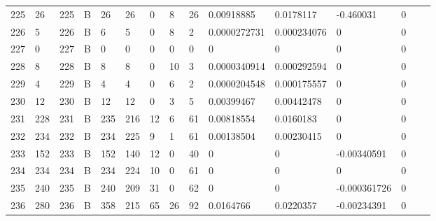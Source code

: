 \begin{longtable}{lllllllllllllll}
	225 & 26                & 225 & B   & 26                & 26                & 0                 & 8    & 26         & 0.00918885     & 0.0178117      & -0.460031     & 0            \\
	226 & 5                 & 226 & B   & 6                 & 5                 & 0                 & 8    & 2          & 0.0000272731   & 0.000234076    & 0             & 0            \\
	227 & 0                 & 227 & B   & 0                 & 0                 & 0                 & 0    & 0          & 0              & 0              & 0             & 0            \\
	228 & 8                 & 228 & B   & 8                 & 8                 & 0                 & 10   & 3          & 0.0000340914   & 0.000292594    & 0             & 0            \\
	229 & 4                 & 229 & B   & 4                 & 4                 & 0                 & 6    & 2          & 0.0000204548   & 0.000175557    & 0             & 0            \\
	230 & 12                & 230 & B   & 12                & 12                & 0                 & 3    & 5          & 0.00399467     & 0.00442478     & 0             & 0            \\
	231 & 228               & 231 & B   & 235               & 216               & 12                & 6    & 61         & 0.00818554     & 0.0160183      & 0             & 0            \\
	232 & 234               & 232 & B   & 234               & 225               & 9                 & 1    & 61         & 0.00138504     & 0.00230415     & 0             & 0            \\
	233 & 152               & 233 & B   & 152               & 140               & 12                & 0    & 40         & 0              & 0              & -0.00340591   & 0            \\
	234 & 234               & 234 & B   & 234               & 224               & 10                & 0    & 61         & 0              & 0              & 0             & 0            \\
	235 & 240               & 235 & B   & 240               & 209               & 31                & 0    & 62         & 0              & 0              & -0.000361726  & 0            \\
	236 & 280               & 236 & B   & 358               & 215               & 65                & 26   & 92         & 0.0164766      & 0.0220357      & -0.00234391   & 0            \\

\end{longtable}
